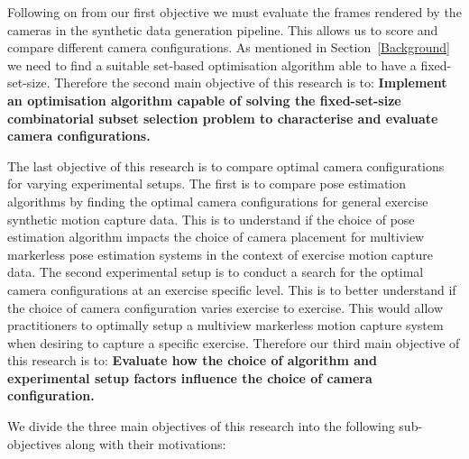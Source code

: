 Following on from our first objective we must evaluate the frames rendered by the cameras in the synthetic data generation pipeline. This allows us to score and compare different camera configurations. As mentioned in Section~\ref{Background} we need to find a suitable set-based optimisation algorithm able to have a fixed-set-size. Therefore the second main objective of this research is to: \textbf{Implement an optimisation algorithm capable of solving the fixed-set-size combinatorial subset selection problem to characterise and evaluate camera configurations.}

The last objective of this research is to compare optimal camera configurations for varying experimental setups. The first is to compare pose estimation algorithms by finding the optimal camera configurations for general exercise synthetic motion capture data. This is to understand if the choice of pose estimation algorithm impacts the choice of camera placement for multiview markerless pose estimation systems in the context of exercise motion capture data. The second experimental setup is to conduct a search for the optimal camera configurations at an exercise specific level. This is to better understand if the choice of camera configuration varies exercise to exercise. This would allow practitioners to optimally setup a multiview markerless motion capture system when desiring to capture a specific exercise. Therefore our third main objective of this research is to: \textbf{Evaluate how the choice of algorithm and experimental setup factors influence the choice of camera configuration.}

We divide the three main objectives of this research into the following sub-objectives along with their motivations:


